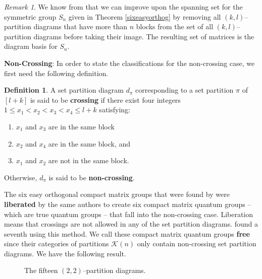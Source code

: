 \documentclass{article}
\theoremstyle{plain}
\theoremstyle{definition}
\newtheorem{definition}[theorem]{Definition}
\theoremstyle{remark}
\newtheorem{remark}[theorem]{Remark}
\begin{document}
\begin{remark}
	We know from \citet{godfrey} that
	we can improve upon the spanning set for
	the symmetric group $S_n$ given in Theorem \ref{sixeasyorthog}
	by removing all $(k,l)$--partition diagrams 
	that have more than $n$ blocks 
	from the set of all $(k,l)$--partition diagrams
	before taking their image.
	The resulting set of matrices is the diagram basis for $S_n$.
\end{remark}

\textbf{Non-Crossing}: 
In order to state the classifications for the non-crossing case,
we first need the following definition.

\begin{definition}
	A set partition diagram $d_\pi$ corresponding to a set partition $\pi$ of $[l+k]$ is said to be \textbf{crossing}
	if there exist four integers
	$1 \leq x_1 < x_2 < x_3 < x_4 \leq l+k$ 
	satisfying:
	\begin{enumerate}
		\item $x_1$ and $x_3$ are in the same block 
		\item $x_2$ and $x_4$ are in the same block, and
		\item $x_1$ and $x_2$ are not in the same block.
	\end{enumerate}
	Otherwise, $d_\pi$ is said to be \textbf{non-crossing}.
\end{definition}

The six easy orthogonal compact matrix groups that were found by
\citet{banica}
were \textbf{liberated} by the same authors
to create six 
compact matrix quantum groups -- which are true quantum groups -- 
that fall into the non-crossing case. 
Liberation means that crossings are not allowed in any of the set partition diagrams.
\citet{weber2013}
found a seventh using this method.
We call these compact matrix quantum groups \textbf{free} since their categories of partitions $\mathcal{K}(n)$
only contain non-crossing set partition diagrams.
We have the following result.


\begin{figure}[tb]
	\begin{tcolorbox}[colback=white!02, colframe=black]
	\begin{center}
	\end{center}
	\end{tcolorbox}
	\caption{
		The fifteen $(2,2)$--partition diagrams.
	}
	\label{22diagrams}
\end{figure}
\end{document}
